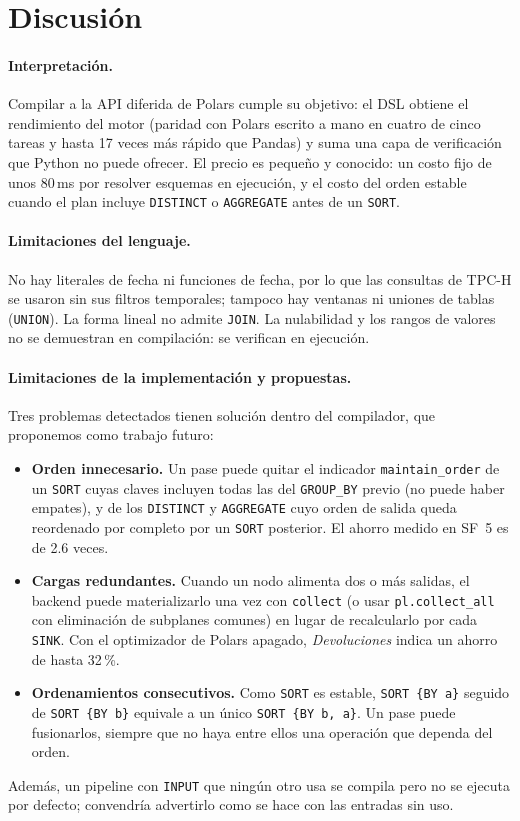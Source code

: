 \documentclass[sigplan,screen,nonacm]{acmart}
\begin{document}
\section{Discusión}
\label{sec:discusion}

\paragraph{Interpretación.} Compilar a la API diferida de Polars cumple su objetivo: el DSL
obtiene el rendimiento del motor (paridad con Polars escrito a mano en cuatro de cinco tareas
y hasta 17 veces más rápido que Pandas) y suma una capa de verificación que Python no puede
ofrecer. El precio es pequeño y conocido: un costo fijo de unos 80\,ms por resolver esquemas
en ejecución, y el costo del orden estable cuando el plan incluye \texttt{DISTINCT} o
\texttt{AGGREGATE} antes de un \texttt{SORT}.

\paragraph{Limitaciones del lenguaje.} No hay literales de fecha ni funciones de fecha, por
lo que las consultas de TPC-H se usaron sin sus filtros temporales; tampoco hay ventanas ni
uniones de tablas (\texttt{UNION}). La forma lineal no admite \texttt{JOIN}. La nulabilidad y
los rangos de valores no se demuestran en compilación: se verifican en ejecución.

\paragraph{Limitaciones de la implementación y propuestas.} Tres problemas detectados tienen
solución dentro del compilador, que proponemos como trabajo futuro:
\begin{itemize}
  \item \textbf{Orden innecesario.} Un pase puede quitar el indicador
    \texttt{maintain\_order} de un
    \texttt{SORT} cuyas claves incluyen todas las del \texttt{GROUP\_BY} previo (no puede haber
    empates), y de los \texttt{DISTINCT} y \texttt{AGGREGATE} cuyo orden de salida queda
    reordenado por completo por un \texttt{SORT} posterior. El ahorro medido en SF~5 es de
    2.6 veces.
  \item \textbf{Cargas redundantes.} Cuando un nodo alimenta dos o más salidas, el backend
    puede materializarlo una vez con \texttt{collect} (o usar \texttt{pl.collect\_all} con
    eliminación de subplanes comunes) en lugar de recalcularlo por cada \texttt{SINK}. Con el
    optimizador de Polars apagado, \emph{Devoluciones} indica un ahorro de hasta 32\,\%.
  \item \textbf{Ordenamientos consecutivos.} Como \texttt{SORT} es estable,
    \texttt{SORT \{BY a\}} seguido de \texttt{SORT \{BY b\}} equivale a un único
    \texttt{SORT \{BY b, a\}}. Un pase puede fusionarlos, siempre que no haya entre ellos una
    operación que dependa del orden.
\end{itemize}
Además, un pipeline con \texttt{INPUT} que ningún otro usa se compila pero no se ejecuta por
defecto; convendría advertirlo como se hace con las entradas sin uso.
\end{document}
